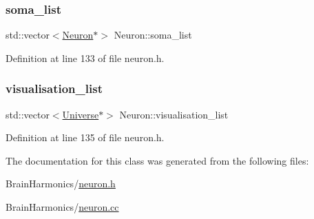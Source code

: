 \subsubsection{\texorpdfstring{soma\+\_\+list}{soma\_list}}
{\footnotesize\ttfamily std\+::vector$<$\mbox{\hyperlink{class_neuron}{Neuron}}$\ast$$>$ Neuron\+::soma\+\_\+list\hspace{0.3cm}{\ttfamily [protected]}}



Definition at line 133 of file neuron.\+h.

\mbox{\label{class_neuron_a00b1e2e5f9d224759df1aa54093092ba}} 
\subsubsection{\texorpdfstring{visualisation\+\_\+list}{visualisation\_list}}
{\footnotesize\ttfamily std\+::vector$<$\mbox{\hyperlink{class_universe}{Universe}}$\ast$$>$ Neuron\+::visualisation\+\_\+list\hspace{0.3cm}{\ttfamily [protected]}}



Definition at line 135 of file neuron.\+h.



The documentation for this class was generated from the following files\+:\begin{DoxyCompactItemize}
\item 
Brain\+Harmonics/\mbox{\hyperlink{neuron_8h}{neuron.\+h}}\item 
Brain\+Harmonics/\mbox{\hyperlink{neuron_8cc}{neuron.\+cc}}\end{DoxyCompactItemize}
